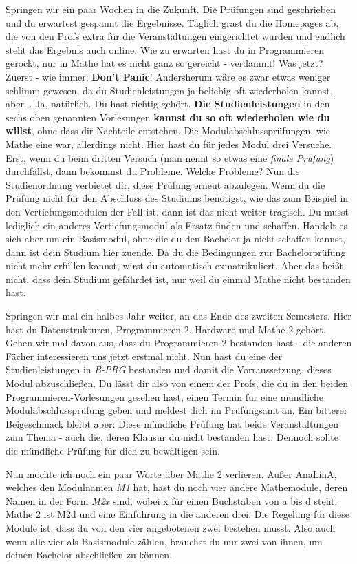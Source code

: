 Springen wir ein paar Wochen in die Zukunft. 
Die Prüfungen sind geschrieben und du erwartest gespannt die Ergebnisse.
Täglich grast du die Homepages ab, die von den Profs extra für die Veranstaltungen eingerichtet wurden und endlich steht das Ergebnis auch online.
Wie zu erwarten hast du in Programmieren gerockt, nur in Mathe hat es nicht ganz so gereicht - verdammt!
Was jetzt?
Zuerst - wie immer: \textbf{Don't Panic}!
Andersherum wäre es zwar etwas weniger schlimm gewesen, da du Studienleistungen ja beliebig oft wiederholen kannst, aber...
Ja, natürlich.
Du hast richtig gehört.
\textbf{Die Studienleistungen} in den sechs oben genannten Vorlesungen \textbf{kannst du so oft wiederholen wie du willst}, ohne dass dir Nachteile entstehen.
Die Modulabschlussprüfungen, wie Mathe eine war, allerdings nicht.
Hier hast du für jedes Modul drei Versuche.
Erst, wenn du beim dritten Versuch (man nennt so etwas eine \emph{finale Prüfung}) durchfällst, dann bekommst du Probleme.
Welche Probleme?
Nun die Studienordnung verbietet dir, diese Prüfung erneut abzulegen.
Wenn du die Prüfung nicht für den Abschluss des Studiums benötigst, wie das zum Beispiel in den Vertiefungsmodulen der Fall ist, dann ist das nicht weiter tragisch.
Du musst lediglich ein anderes Vertiefungsmodul als Ersatz finden und schaffen.
Handelt es sich aber um ein Basismodul, ohne die du den Bachelor ja nicht schaffen kannst, dann ist dein Studium hier zuende.
Da du die Bedingungen zur Bachelorprüfung nicht mehr erfüllen kannst, wirst du automatisch exmatrikuliert.
Aber das heißt nicht, dass dein Studium gefährdet ist, nur weil du einmal Mathe nicht bestanden hast.

Springen wir mal ein halbes Jahr weiter, an das Ende des zweiten Semesters.
Hier hast du Datenstrukturen, Programmieren 2, Hardware und Mathe 2 gehört.
Gehen wir mal davon aus, dass du Programmieren 2 bestanden hast - die anderen Fächer interessieren uns jetzt erstmal nicht.
Nun hast du eine der Studienleistungen in \emph{B-PRG} bestanden und damit die Vorraussetzung, dieses Modul abzuschließen.
Du lässt dir also von einem der Profs, die du in den beiden Programmieren-Vorlesungen gesehen hast, einen Termin für eine mündliche Modulabschlussprüfung geben und meldest dich im Prüfungsamt an.
Ein bitterer Beigeschmack bleibt aber: 
Diese mündliche Prüfung hat beide Veranstaltungen zum Thema - auch die, deren Klausur du nicht bestanden hast.
Dennoch sollte die mündliche Prüfung für dich zu bewältigen sein.

Nun möchte ich noch ein paar Worte über Mathe 2 verlieren.
Außer AnaLinA, welches den Modulnamen \emph{M1} hat, hast du noch vier andere Mathemodule, deren Namen in der Form \emph{M2x} sind, wobei x für einen Buchstaben von a bis d steht.
Mathe 2 ist M2d und eine Einführung in die anderen drei.
Die Regelung für diese Module ist, dass du von den vier angebotenen zwei bestehen musst.
Also auch wenn alle vier als Basismodule zählen, brauchst du nur zwei von ihnen, um deinen Bachelor abschließen zu können.

